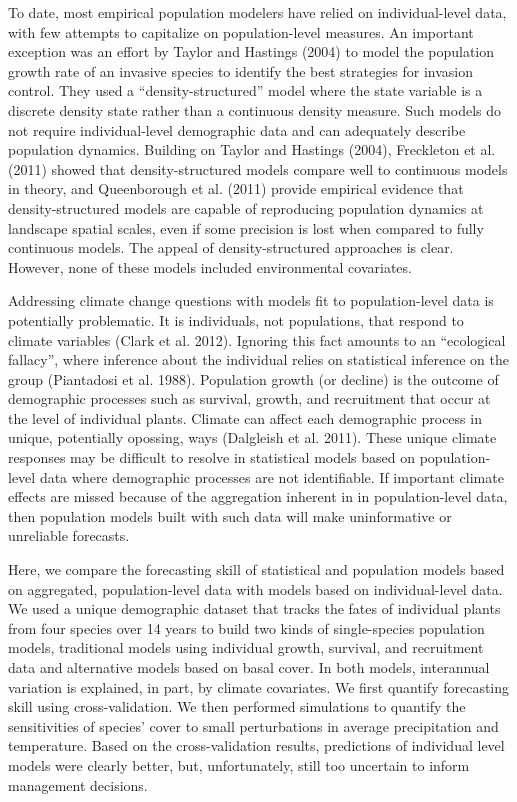 \documentclass[12pt,]{article}
\begin{document}
To date, most empirical population modelers have relied on
individual-level data, with few attempts to capitalize on
population-level measures. An important exception was an effort by
Taylor and Hastings (2004) to model the population growth rate of an
invasive species to identify the best strategies for invasion control.
They used a ``density-structured'' model where the state variable is a
discrete density state rather than a continuous density measure. Such
models do not require individual-level demographic data and can
adequately describe population dynamics. Building on Taylor and Hastings
(2004), Freckleton et al. (2011) showed that density-structured models
compare well to continuous models in theory, and Queenborough et al.
(2011) provide empirical evidence that density-structured models are
capable of reproducing population dynamics at landscape spatial scales,
even if some precision is lost when compared to fully continuous models.
The appeal of density-structured approaches is clear. However, none of
these models included environmental covariates.

Addressing climate change questions with models fit to population-level
data is potentially problematic. It is individuals, not populations,
that respond to climate variables (Clark et al. 2012). Ignoring this
fact amounts to an ``ecological fallacy'', where inference about the
individual relies on statistical inference on the group (Piantadosi et
al. 1988). Population growth (or decline) is the outcome of demographic
processes such as survival, growth, and recruitment that occur at the
level of individual plants. Climate can affect each demographic process
in unique, potentially opossing, ways (Dalgleish et al. 2011). These
unique climate responses may be difficult to resolve in statistical
models based on population-level data where demographic processes are
not identifiable. If important climate effects are missed because of the
aggregation inherent in in population-level data, then population models
built with such data will make uninformative or unreliable forecasts.

Here, we compare the forecasting skill of statistical and population
models based on aggregated, population-level data with models based on
individual-level data. We used a unique demographic dataset that tracks
the fates of individual plants from four species over 14 years to build
two kinds of single-species population models, traditional models using
individual growth, survival, and recruitment data and alternative models
based on basal cover. In both models, interannual variation is
explained, in part, by climate covariates. We first quantify forecasting
skill using cross-validation. We then performed simulations to quantify
the sensitivities of species' cover to small perturbations in average
precipitation and temperature. Based on the cross-validation results,
predictions of individual level models were clearly better, but,
unfortunately, still too uncertain to inform management decisions.
\end{document}

